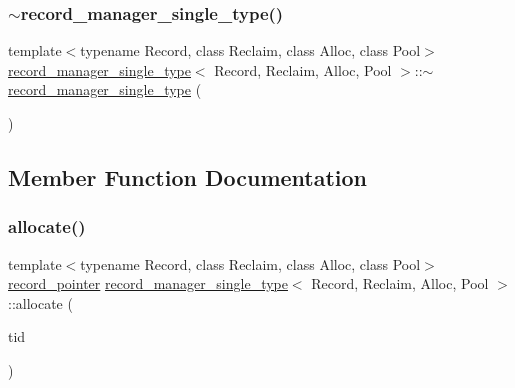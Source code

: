 \mbox{\label{classrecord__manager__single__type_adeb03ec2262c1b202204e4dcf09308f9}} 
\subsubsection{\texorpdfstring{$\sim$record\+\_\+manager\+\_\+single\+\_\+type()}{~record\_manager\_single\_type()}}
{\footnotesize\ttfamily template$<$typename Record, class Reclaim, class Alloc, class Pool$>$ \\
\hyperlink{classrecord__manager__single__type}{record\+\_\+manager\+\_\+single\+\_\+type}$<$ Record, Reclaim, Alloc, Pool $>$\+::$\sim$\hyperlink{classrecord__manager__single__type}{record\+\_\+manager\+\_\+single\+\_\+type} (\begin{DoxyParamCaption}{ }\end{DoxyParamCaption})\hspace{0.3cm}{\ttfamily [inline]}}



\subsection{Member Function Documentation}
\mbox{\label{classrecord__manager__single__type_a6f2b9a69087a98463e24981b3165f111}} 
\subsubsection{\texorpdfstring{allocate()}{allocate()}}
{\footnotesize\ttfamily template$<$typename Record, class Reclaim, class Alloc, class Pool$>$ \\
\hyperlink{classrecord__manager__single__type_a065f05d1a84e619758122b3da04b1327}{record\+\_\+pointer} \hyperlink{classrecord__manager__single__type}{record\+\_\+manager\+\_\+single\+\_\+type}$<$ Record, Reclaim, Alloc, Pool $>$\+::allocate (\begin{DoxyParamCaption}\item[{const int}]{tid }\end{DoxyParamCaption})\hspace{0.3cm}{\ttfamily [inline]}}


